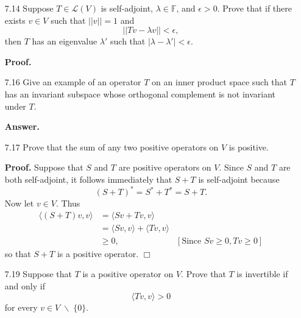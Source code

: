 \documentclass[9pt]{article}
\newcommand{\qed}{\hfill \ensuremath{\Box}}
\newcommand{\F}{\mathbb{F}}
\newcommand{\cyc}[1]{\langle #1 \rangle}
\begin{document}
\begin{enumerate}
   \item[7.14] Suppose $T \in \mathcal{L}(V)$ is self-adjoint, $\lambda \in \F$,
               and $\epsilon > 0$. Prove that if there exists $v \in V$ such
               that $||v|| = 1$ and
               $$||Tv - \lambda v|| < \epsilon,$$
               then $T$ has an eigenvalue $\lambda'$ such that
               $|\lambda - \lambda'| < \epsilon$.
               
      \textbf{Proof.}
   \item[7.16] Give an example of an operator $T$ on an inner product space such
               that $T$ has an invariant subspace whose orthogonal complement is
               not invariant under $T$.

      \textbf{Answer.}
   \item[7.17] Prove that the sum of any two positive operators on $V$ is
               positive.

      \textbf{Proof.} Suppose that $S$ and $T$ are positive operators on $V$.
      Since $S$ and $T$ are both self-adjoint, it follows immediately that
      $S + T$ is self-adjoint because
      $$(S+T)^* = S^*+T^* = S + T.$$
      Now let $v \in V$. Thus
      \begin{align*}
         \cyc{(S+T)v,v} &= \cyc{Sv + Tv, v} \\
            &= \cyc{Sv, v} + \cyc{Tv, v} \\
            &\ge 0, &[\text{Since } Sv \ge 0, Tv \ge 0]
      \end{align*}
      so that $S + T$ is a positive operator. \qed
   \item[7.19] Suppose that $T$ is a positive operator on $V$. Prove that $T$ is
               invertible if and only if
               $$\cyc{Tv, v} > 0$$
               for every $v \in V\;\backslash\;\{0\}$.


\end{enumerate}
\end{document}
